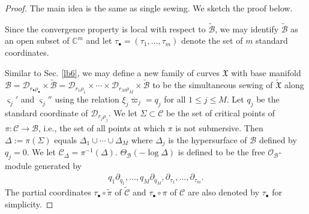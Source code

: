 \documentclass[11pt,b5paper,notitlepage]{article}
\theoremstyle{definition}
\theoremstyle{plain}
\newcommand{\fk}{\mathfrak}
\newcommand{\mc}{\mathcal}
\newcommand{\wtd}{\widetilde}
\newcommand{\scr}{\mathscr}
\newcommand{\sgm}{\varsigma}
\newcommand{\blt}{\bullet}
\newcommand{\Cbb}{\mathbb C}
\numberwithin{equation}{section}
\begin{document}
\begin{proof}
The main idea is the same as single sewing. We sketch the proof below.

Since the convergence property is local with respect to $\wtd{\mc B}$, we may identify $\wtd{\mc B}$ as an open subset of $\Cbb^m$ and let $\tau_\blt=(\tau_1,\dots,\tau_m)$ denote the set of  $m$ standard  coordinates. 



Similar to Sec. \ref{lb6}, we may define a new family of curves $\fk X$ with base manifold $\mc B=\mc D_{r_\blt\rho_\blt}\times\wtd{\mc B}=\mc D_{r_1\rho_1}\times\cdots\times\mc D_{r_M\rho_M}\times\wtd{\mc B}$ to be the simultaneous sewing of $\wtd{\fk X}$ along $\sgm_j'$ and $\sgm_j''$ using the relation $\xi_j\varpi_j=q_j$ for all $1\leq j\leq M$. Let $q_j$ be the standard coordinate of $\mc D_{r_j\rho_j}$. We let $\Sigma\subset\mc C$ be the set of critical points of $\pi:\mc C\rightarrow\mc B$, i.e., the set of all points at which $\pi$ is not submersive. Then $\Delta:=\pi(\Sigma)$ equals $\Delta_1\cup\cdots\cup\Delta_M$ where $\Delta_j$ is the hypersurface of $\mc B$ defined by $q_j=0$. We let $\mc C_\Delta=\pi^{-1}(\Delta)$. $\Theta_{\mc B}(-\log\Delta)$ is defined to be the free $\scr O_{\mc B}$-module generated by
\begin{align*}
	q_1\partial_{q_1},\dots,q_M\partial_{q_M},\partial_{\tau_1},\dots,\partial_{\tau_m}.
\end{align*}
The partial coordinates $\tau_\blt\circ\wtd\pi$ of $\wtd{\mc C}$ and $\tau_\blt\circ\pi$ of $\mc C$ are also denoted by $\tau_\blt$ for simplicity.


\end{proof}
\end{document}
